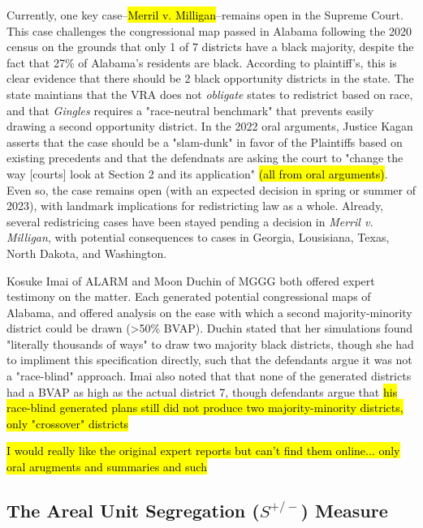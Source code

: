 \documentclass{article}
\begin{document}
\par 
Currently, one key case--\hl{Merril v. Milligan}--remains open in the Supreme Court. This case challenges the congressional map passed in Alabama following the 2020 census on the grounds that only 1 of 7 districts have a black majority, despite the fact that 27\% of Alabama's residents are black. According to plaintiff's, this is clear evidence that there should be 2 black opportunity districts in the state. The state maintians that the VRA does not \emph{obligate} states to redistrict based on race, and that \emph{Gingles} requires a "race-neutral benchmark" that prevents easily drawing a second opportunity district. In the 2022 oral arguments, Justice Kagan asserts that the case should be a "slam-dunk" in favor of the Plaintiffs based on existing precedents and that the defendnats are asking the court to "change the way [courts] look at Section 2 and its application" \hl{(all from oral arguments)}. Even so, the case remains open (with an expected decision in spring or summer of 2023), with landmark implications for redistricting law as a whole. Already, several redistricing cases have been stayed pending a decision in \emph{Merril v. Milligan}, with potential consequences to cases in Georgia, Lousisiana, Texas, North Dakota, and Washington.
\par
Kosuke Imai of ALARM and Moon Duchin of MGGG both offered expert testimony on the matter. Each generated potential congressional maps of Alabama, and offered analysis on the ease with which a second majority-minority district could be drawn (>50\% BVAP). Duchin stated that her simulations found "literally thousands of ways" to draw two majority black districts, though she had to impliment this specification directly, such that the defendants argue it was not a "race-blind" approach. Imai also noted that that none of the generated districts had a BVAP as high as the actual district 7, though defendants argue that \hl{his race-blind generated plans still did not produce two majority-minority districts, only "crossover" districts}
\par
\hl{I would really like the original expert reports but can't find them online... only oral arugments and summaries and such}
 
\subsection{The Areal Unit Segregation ($S^{+/-}$) Measure}\label{AUS}
\end{document}
